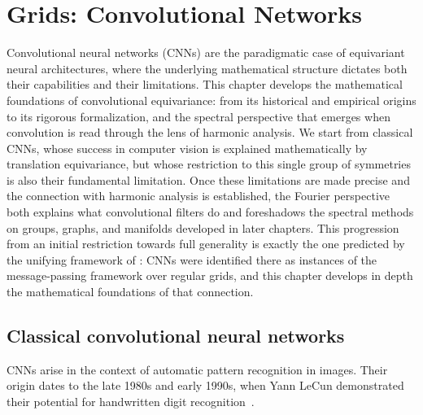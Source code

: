 \chapter{Grids: Convolutional Networks}
\label{ch:grids}

\providecommand{\conv}{*}
\providecommand{\Ft}{\mathcal{F}}
\providecommand{\sinc}{\operatorname{sinc}}
\providecommand{\tr}{\operatorname{tr}}
\providecommand{\diag}{\operatorname{diag}}
\providecommand{\supp}{\operatorname{supp}}

Convolutional neural networks (CNNs) are the paradigmatic case of equivariant
neural architectures, where the underlying mathematical structure dictates both
their capabilities and their limitations. This chapter develops the mathematical
foundations of convolutional equivariance: from its historical and empirical
origins to its rigorous formalization, and the spectral perspective that
emerges when convolution is read through the lens of harmonic analysis. We
start from classical CNNs, whose success in computer vision is explained
mathematically by translation equivariance, but whose restriction to this single
group of symmetries is also their fundamental limitation. Once these limitations
are made precise and the connection with harmonic analysis is established, the
Fourier perspective both explains what convolutional filters do and foreshadows
the spectral methods on groups, graphs, and manifolds developed in later
chapters. This progression from an initial restriction towards full generality
is exactly the one predicted by the unifying framework of
: CNNs were identified there as instances of the
message-passing framework over regular grids, and this chapter develops in depth
the mathematical foundations of that connection.

\section{Classical convolutional neural networks}
\label{sec:grids:classical}

CNNs arise in the context of automatic pattern recognition in images. Their
origin dates to the late 1980s and early 1990s, when Yann LeCun demonstrated
their potential for handwritten digit recognition~\citep{lecun1989}.

